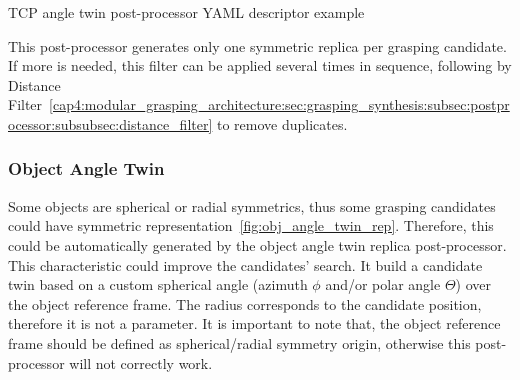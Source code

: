 \begin{snippet}[h!]
\centering
{}
\caption{TCP angle twin post-processor YAML descriptor example}
\label{code:tcp_angle_twin}
\end{snippet}


This post-processor generates only one symmetric replica per grasping candidate. If more is needed, this filter can be applied several times in sequence, following by Distance Filter~\ref{cap4:modular_grasping_architecture:sec:grasping_synthesis:subsec:postprocessor:subsubsec:distance_filter} to remove duplicates.

\subsubsection{Object Angle Twin}
\label{cap4:modular_grasping_architecture:sec:grasping_synthesis:subsec:postprocessor:subsubsec:obj_angle_twin}

Some objects are spherical or radial symmetrics, thus some grasping candidates could have symmetric representation~\ref{fig:obj_angle_twin_rep}. Therefore, this could be automatically generated by the object angle twin replica post-processor. This characteristic could improve the candidates' search. It build a candidate twin based on a custom spherical angle (azimuth $\phi$ and/or polar angle $\Theta$) over the object reference frame. The radius corresponds to the candidate position, therefore it is not a parameter. It is important to note that, the object reference frame should be defined as spherical/radial symmetry origin, otherwise this post-processor will not correctly work. 

